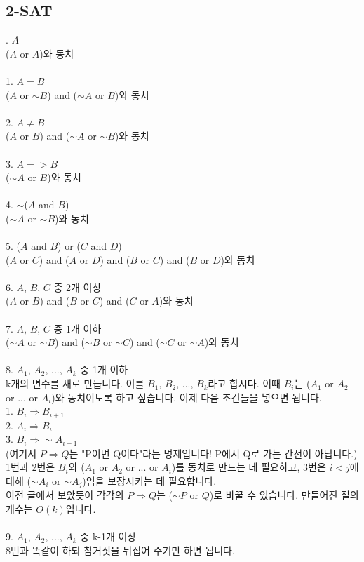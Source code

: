 \documentclass[landscape, 8pt, a4paper, oneside, twocolumn]{extarticle}
\begin{document}
	\subsection {2-SAT}
		. $A$\\
		($A$ or $A$)와 동치\\\\
		1. $A= B$\\
		($A$ or $\sim B$) and ($\sim A$ or $B$)와 동치\\\\
		2. $A\neq B$\\
		($A$ or $B$) and ($\sim A$ or $\sim B$)와 동치\\\\
		3. $A=>B$\\
		($\sim A$ or $B$)와 동치\\\\
		4. $\sim $($A$ and $B$)\\
		($\sim A$ or $\sim B$)와 동치\\\\
		5. ($A$ and $B$) or ($C$ and $D$)\\
		($A$ or $C$) and ($A$ or $D$) and ($B$ or $C$) and ($B$ or $D$)와 동치\\\\
		6. $A$, $B$, $C$ 중 2개 이상\\
		($A$ or $B$) and ($B$ or $C$) and ($C$ or $A$)와 동치\\\\
		7. $A$, $B$, $C$ 중 1개 이하\\
		($\sim A$ or $\sim B$) and ($\sim B$ or $\sim C$) and ($\sim C$ or $\sim A$)와 동치\\\\
		8. $A_{1}$, $A_{2}$, ..., $A_{k}$ 중 1개 이하\\
		k개의 변수를 새로 만듭니다. 이를 $B_{1}$, $B_{2}$, ..., $B_{k}$라고 합시다. 이때 $B_{i}$는 ($A_{1}$ or $A_{2}$ or ... or $A_{i}$)와 동치이도록 하고 싶습니다. 이제 다음 조건들을 넣으면 됩니다.\\
		1. $B_{i}\Rightarrow B_{i+1}$\\
		2. $A_{i}\Rightarrow B_{i}$\\
		3. $B_{i}\Rightarrow \sim A_{i+1}$\\
		(여기서 $P\Rightarrow Q$는 "P이면 Q이다"라는 명제입니다! P에서 Q로 가는 간선이 아닙니다.)\\
		1번과 2번은 $B_{i}$와 ($A_{1}$ or $A_{2}$ or ... or $A_{i}$)를 동치로 만드는 데 필요하고, 3번은 $i<j$에 대해 ($\sim A_{i}$ or $\sim A_{j}$)임을 보장시키는 데 필요합니다.\\
		이전 글에서 보았듯이 각각의 $P\Rightarrow Q$는 ($\sim P$ or $Q$)로 바꿀 수 있습니다. 만들어진 절의 개수는 $O(k)$입니다.\\\\
		9. $A_{1}$, $A_{2}$, ..., $A_{k}$ 중 k-1개 이상\\
		8번과 똑같이 하되 참거짓을 뒤집어 주기만 하면 됩니다.
\end{document}
